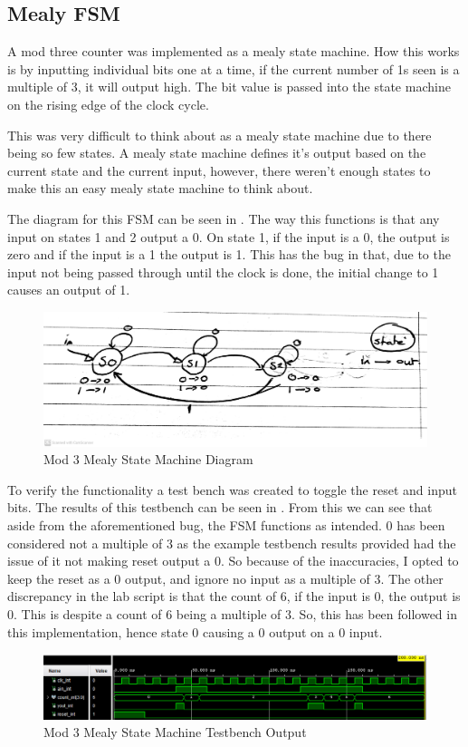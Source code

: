 \documentclass[a4paper, 12pt]{article}
\begin{document}
		\subsection{Mealy FSM}
			A mod three counter was implemented as a mealy state machine. How this works is by inputting individual bits one at a time, if the current number of 1s seen is a multiple of 3, it will output high. The bit value is passed into the state machine on the rising edge of the clock cycle.
			\par
			This was very difficult to think about as a mealy state machine due to there being so few states. A mealy state machine defines it's output based on the current state and the current input, however, there weren't enough states to make this an easy mealy state machine to think about.
			\par
			The diagram for this FSM can be seen in . The way this functions is that any input on states 1 and 2 output a 0. On state 1, if the input is a 0, the output is zero and if the input is a 1 the output is 1. This has the bug in that, due to the input not being passed through until the clock is done, the initial change to 1 causes an output of 1. 
			\begin{figure}[!ht]
				\centering
				\includegraphics[width=\columnwidth]{Mealy_FSM.jpg}
				\caption{Mod 3 Mealy State Machine Diagram}
				\label{fig:mealyDiag}
			\end{figure}
			\par
			To verify the functionality a test bench was created to toggle the reset and input bits. The results of this testbench can be seen in . From this we can see that aside from the aforementioned bug, the FSM functions as intended. 0 has been considered not a multiple of 3 as the example testbench results provided had the issue of it not making reset output a 0. So because of the inaccuracies, I opted to keep the reset as a 0 output, and ignore no input as a multiple of 3. The other discrepancy in the lab script is that the count of 6, if the input is 0, the output is 0. This is despite a count of 6 being a multiple of 3. So, this has been followed in this implementation, hence state 0 causing a 0 output on a 0 input.
			\begin{figure}[!ht]
				\centering
				\includegraphics[width=\columnwidth]{mealy.png}
				\caption{Mod 3 Mealy State Machine Testbench Output}
				\label{fig:mealy}
			\end{figure}
\end{document}
